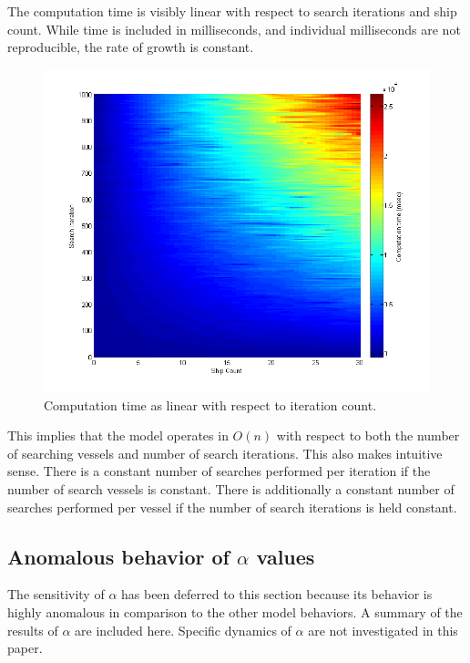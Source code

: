 \documentclass[a4paper]{article}
\begin{document}
The computation time is visibly linear with respect to search iterations and ship count. While time is included in milliseconds, and individual milliseconds are not reproducible, the rate of growth is constant. 

\begin{figure}[H]\begin{center}
\includegraphics[scale=0.6]{../Matlab/Images/CompTimeByItersShips.png}
\caption{Computation time as linear with respect to iteration count.}
\end{center}\end{figure}

This implies that the model operates in $O(n)$ with respect to both the number of searching vessels and number of search iterations. This also makes intuitive sense. There is a constant number of searches performed per iteration if the number of search vessels is constant. There is additionally a constant number of searches performed per vessel if the number of search iterations is held constant.

\subsection{Anomalous behavior of $\alpha$ values}

The sensitivity of $\alpha$ has been deferred to this section because its behavior is highly anomalous in comparison to the other model behaviors. A summary of the results of $\alpha$ are included here. Specific dynamics of $\alpha$ are not investigated in this paper.
\end{document}
